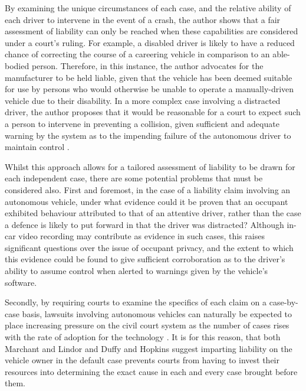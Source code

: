 \documentclass[conference]{IEEEtran}
\begin{document}
 By examining the unique circumstances of each case, and the relative ability of each driver to intervene in the event of a crash, the author shows that a fair assessment of liability can only be reached when these capabilities are considered under a court's ruling. For example, a disabled driver is likely to have a reduced chance of correcting the course of a careering vehicle in comparison to an able-bodied person. Therefore, in this instance, the author advocates for the manufacturer to be held liable, given that the vehicle has been deemed suitable for use by persons who would otherwise be unable to operate a manually-driven vehicle due to their disability. In a more complex case involving a distracted driver, the author proposes that it would be reasonable for a court to expect such a person to intervene in preventing a collision, given sufficient and adequate warning by the system as to the impending failure of the autonomous driver to maintain control \cite{gurney}. 

Whilst this approach allows for a tailored assessment of liability to be drawn for each independent case, there are some potential problems that must be considered also. First and foremost, in the case of a liability claim involving an autonomous vehicle, under what evidence could it be proven that an occupant  exhibited behaviour attributed to that of an attentive driver, rather than the case a defence is likely to put forward in that the driver was distracted? Although in-car video recording may contribute as evidence in such cases, this raises significant questions over the issue of occupant privacy, and the extent to which this evidence could be found to give sufficient corroboration as to the driver's ability to assume control when alerted to warnings given by the vehicle's software.

Secondly, by requiring courts to examine the specifics of each claim on a case-by-case basis, lawsuits involving autonomous vehicles can naturally be expected to place increasing pressure on the civil court system as the number of cases rises with the rate of adoption for the technology \cite{marchant}. It is for this reason, that both Marchant and Lindor \cite{marchant} and Duffy and Hopkins \cite{duffy} suggest imparting liability on the vehicle owner in the default case prevents courts from having to invest their resources into determining the exact cause in each and every case brought before them.
\end{document}
